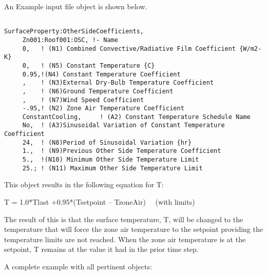 An Example input file object is shown below.

\begin{lstlisting}

SurfaceProperty:OtherSideCoefficients,
     Zn001:Roof001:OSC, !- Name
     0,   ! (N1) Combined Convective/Radiative Film Coefficient {W/m2-K}
     0,   ! (N5) Constant Temperature {C}
     0.95,!(N4) Constant Temperature Coefficient
     ,    ! (N3)External Dry-Bulb Temperature Coefficient
     ,    ! (N6)Ground Temperature Coefficient
     ,    ! (N7)Wind Speed Coefficient
     -.95,! (N2) Zone Air Temperature Coefficient
     ConstantCooling,     ! (A2) Constant Temperature Schedule Name
     No,  ! (A3)Sinusoidal Variation of Constant Temperature Coefficient
     24,  ! (N8)Period of Sinusoidal Variation {hr}
     1.,  ! (N9)Previous Other Side Temperature Coefficient
     5.,  !(N10) Minimum Other Side Temperature Limit
     25.; ! (N11) Maximum Other Side Temperature Limit
\end{lstlisting}

This object results in the following equation for T:

T = 1.0*Tlast +0.95*(Tsetpoint -- TzoneAir)~~ (with limits)

The result of this is that the surface temperature, T, will be changed to the temperature that will force the zone air temperature to the setpoint providing the temperature limits are not reached. When the zone air temperature is at the setpoint, T remains at the value it had in the prior time step.

A complete example with all pertinent objects:

